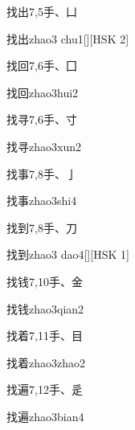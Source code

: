 \begin{Entry}{找出}{7,5}{⼿、⼐}
  \begin{Phonetics}{找出}{zhao3 chu1}[][HSK 2]
  \end{Phonetics}
\end{Entry}

\begin{Entry}{找回}{7,6}{⼿、⼞}
  \begin{Phonetics}{找回}{zhao3hui2}
  \end{Phonetics}
\end{Entry}

\begin{Entry}{找寻}{7,6}{⼿、⼨}
  \begin{Phonetics}{找寻}{zhao3xun2}
  \end{Phonetics}
\end{Entry}

\begin{Entry}{找事}{7,8}{⼿、⼅}
  \begin{Phonetics}{找事}{zhao3shi4}
  \end{Phonetics}
\end{Entry}

\begin{Entry}{找到}{7,8}{⼿、⼑}
  \begin{Phonetics}{找到}{zhao3 dao4}[][HSK 1]
  \end{Phonetics}
\end{Entry}

\begin{Entry}{找钱}{7,10}{⼿、⾦}
  \begin{Phonetics}{找钱}{zhao3qian2}
  \end{Phonetics}
\end{Entry}

\begin{Entry}{找着}{7,11}{⼿、⽬}
  \begin{Phonetics}{找着}{zhao3zhao2}
  \end{Phonetics}
\end{Entry}

\begin{Entry}{找遍}{7,12}{⼿、⾡}
  \begin{Phonetics}{找遍}{zhao3bian4}
  \end{Phonetics}
\end{Entry}

